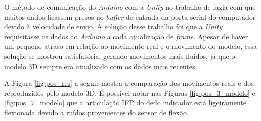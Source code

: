 O método de comunicação do \textit{Arduino} com a \textit{Unity} no trabalho de  fazia com que muitos dados ficassem presos no \textit{buffer} de entrada da porta serial do computador devido à velocidade de envio. A solução desse trabalho foi que a \textit{Unity} requisitasse os dados ao \textit{Arduino} a cada atualização de \textit{frame}.  Apesar de haver um pequeno atraso em relação ao movimento real e o movimento do modelo, essa solução se mostrou satisfatória, gerando movimentos mais fluidos, já que o modelo \ac{3D} sempre era atualizado com os dados mais recentes.

A Figura \ref{fig:pos_res} a seguir mostra a comparação dos movimentos reais e dos reproduzidos pelo modelo \ac{3D}. É possível notar nas Figuras \ref{fig:pos_3_modelo} e \ref{fig:pos_7_modelo} que a articulação \ac{IFP} do dedo indicador está ligeiramente flexionada devido a ruídos provenientes do sensor de flexão. 

